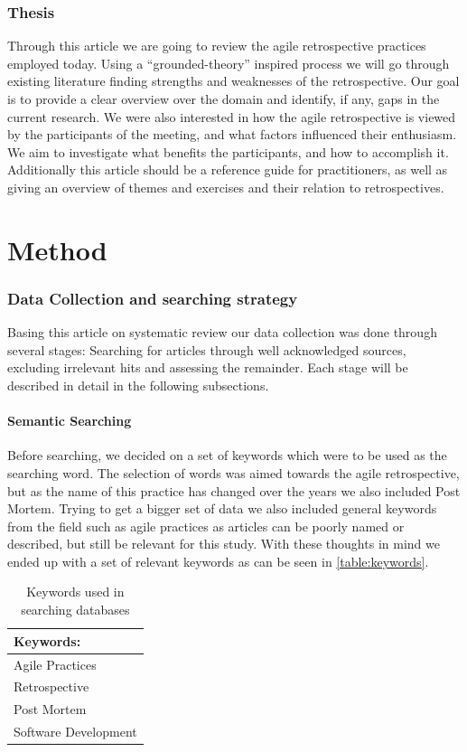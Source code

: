 \documentclass[12pt]{article}
\begin{document}
\section{Thesis}
Through this article we are going to review the agile retrospective practices employed today. Using a ``grounded-theory'' inspired process we will go through existing literature finding strengths and weaknesses of the retrospective. Our goal is to provide a clear overview over the domain and identify, if any, gaps in the current research. We were also interested in how  the agile retrospective is viewed by the participants of the meeting, and what factors influenced their enthusiasm. We aim to investigate what benefits the participants, and how to accomplish it. Additionally this article should be a reference guide for practitioners, as well as giving an overview of themes and exercises and their relation to retrospectives.

\clearpage

\part{Method}

\section{Data Collection and searching strategy}
Basing this article on systematic review our data collection was done through several stages: Searching for articles through well acknowledged sources, excluding irrelevant hits and assessing the remainder. Each stage will be described in detail in the following subsections.

\subsection{Semantic Searching}
Before searching, we decided on a set of keywords which were to be used as the searching word. The selection of words was aimed towards the agile retrospective, but as the name of this practice has changed over the years we also included Post Mortem. Trying to get a bigger set of data we also included general keywords from the field such as agile practices as articles can be poorly named or described, but still be relevant for this study. With these thoughts in mind we ended up with a set of relevant keywords as can be seen in \autoref{table:keywords}.

\begin{table}[!h]
	\begin{center}
		\caption{Keywords used in searching databases}
		\label{table:keywords}
		\begin{tabular}{ l }
			Keywords: \\ \hline
			Agile Practices \\
			Retrospective \\
			Post Mortem \\
			Software Development \\
		\end{tabular}
	\end{center}
\end{table}
\end{document}
